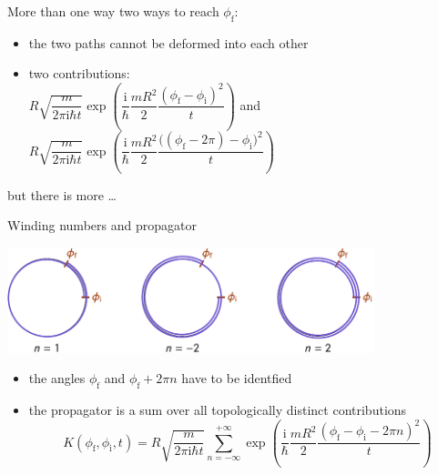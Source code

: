 \documentclass[t,dvipsnames]{beamer}
\begin{document}
\begin{frame}[t]{More than one way}
 two ways to reach $\phi_\text{f}$:\qquad

 \vspace{0.5truecm}
 \begin{itemize}
  \item the two paths cannot be deformed into each other
  \item two contributions:\\[0.2truecm]
	$R\sqrt{\dfrac{m}{2\pi\text{i}\hbar t}}\exp\left(\dfrac{\text{i}}{\hbar}
		 \dfrac{mR^2}{2}\dfrac{(\phi_\text{f}-\phi_\text{i})^2}{t}\right)$
	\quad and\\[0.2truecm]
	$R\sqrt{\dfrac{m}{2\pi\text{i}\hbar t}}\exp\left(\dfrac{\text{i}}{\hbar}
        \dfrac{mR^2}{2}\dfrac{\big((\phi_\text{f}-2\pi)-\phi_\text{i}\big)^2}{t}\right)$
 \end{itemize}
 \begin{flushright}
  but there is more \ldots
 \end{flushright}
\end{frame}

\begin{frame}[t]{Winding numbers and propagator}
 \begin{center}
  \includegraphics[width=0.8\textwidth]{ring_2}
 \end{center}

 \begin{itemize}
  \item the angles $\phi_\text{f}$ and $\phi_\text{f}+2\pi n$ have
	to be identfied
  \item the propagator is a sum over all topologically distinct contributions
	\begin{displaymath}
	 K(\phi_\text{f}, \phi_\text{i}, t) = R\sqrt{\dfrac{m}{2\pi\text{i}\hbar t}}
         \sum_{n=-\infty}^{+\infty}\exp\left(\dfrac{\text{i}}{\hbar}\dfrac{mR^2}{2}
 	 \dfrac{(\phi_\text{f}-\phi_\text{i}-2\pi n)^2}{t}\right)
	\end{displaymath}
 \end{itemize}
\end{frame}
\end{document}
